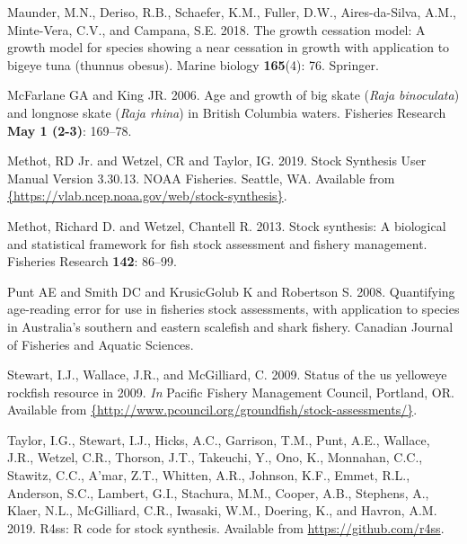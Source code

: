\documentclass[12pt,]{article}
\begin{document}
\leavevmode\hypertarget{ref-maunder2018growth}{}%
Maunder, M.N., Deriso, R.B., Schaefer, K.M., Fuller, D.W.,
Aires-da-Silva, A.M., Minte-Vera, C.V., and Campana, S.E. 2018. The
growth cessation model: A growth model for species showing a near
cessation in growth with application to bigeye tuna (thunnus obesus).
Marine biology \textbf{165}(4): 76. Springer.

\leavevmode\hypertarget{ref-McFandKing2006}{}%
McFarlane GA and King JR. 2006. Age and growth of big skate (\emph{Raja
binoculata}) and longnose skate (\emph{Raja rhina}) in British Columbia
waters. Fisheries Research \textbf{May 1 (2-3)}: 169--78.

\leavevmode\hypertarget{ref-Methot2019}{}%
Methot, RD Jr. and Wetzel, CR and Taylor, IG. 2019. Stock Synthesis User
Manual Version 3.30.13. NOAA Fisheries. Seattle, WA. Available from
\href{\%7Bhttps://vlab.ncep.noaa.gov/web/stock-synthesis\%7D}{\{https://vlab.ncep.noaa.gov/web/stock-synthesis\}}.

\leavevmode\hypertarget{ref-Methot2013}{}%
Methot, Richard D. and Wetzel, Chantell R. 2013. Stock synthesis: A
biological and statistical framework for fish stock assessment and
fishery management. Fisheries Research \textbf{142}: 86--99.

\leavevmode\hypertarget{ref-Punt2008}{}%
Punt AE and Smith DC and KrusicGolub K and Robertson S. 2008.
Quantifying age-reading error for use in fisheries stock assessments,
with application to species in Australia's southern and eastern
scalefish and shark fishery. Canadian Journal of Fisheries and Aquatic
Sciences.

\leavevmode\hypertarget{ref-Stewart2009}{}%
Stewart, I.J., Wallace, J.R., and McGilliard, C. 2009. Status of the us
yelloweye rockfish resource in 2009. \emph{In} Pacific Fishery
Management Council, Portland, OR. Available from
\href{\%7Bhttp://www.pcouncil.org/groundfish/stock-assessments/\%7D}{\{http://www.pcouncil.org/groundfish/stock-assessments/\}}.

\leavevmode\hypertarget{ref-Taylor2019}{}%
Taylor, I.G., Stewart, I.J., Hicks, A.C., Garrison, T.M., Punt, A.E.,
Wallace, J.R., Wetzel, C.R., Thorson, J.T., Takeuchi, Y., Ono, K.,
Monnahan, C.C., Stawitz, C.C., A'mar, Z.T., Whitten, A.R., Johnson,
K.F., Emmet, R.L., Anderson, S.C., Lambert, G.I., Stachura, M.M.,
Cooper, A.B., Stephens, A., Klaer, N.L., McGilliard, C.R., Iwasaki,
W.M., Doering, K., and Havron, A.M. 2019. R4ss: R code for stock
synthesis. Available from \url{https://github.com/r4ss}.
\end{document}
